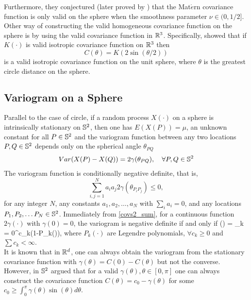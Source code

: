 Furthermore, they conjectured (later proved by \cite{Gneiting2013}) that the Mat$\acute{e}$rn covariance function is only valid on the sphere when the smoothness parameter $\nu\in(0,1/2]$. Other way of constructing the valid homogeneous covariance function on the sphere is by using the valid covariance function in $\mathbb{R}^3$. Specifically, \cite{Yadrenko1983} showed that if $K(\cdot)$ is valid isotropic covariance function on $\mathbb{R}^3$ then
\[
	C(\theta) = K(2\sin(\theta/2))
\]
is a valid isotropic covariance function on the unit sphere, where $\theta$ is the greatest circle distance on the sphere.
			
		\subsection{Variogram on a Sphere}
			
Parallel to the case of circle, if a random process $X(\cdot)$ on a sphere is intrinsically stationary on $\mathbb{S}^2$, then one has $E(X(P))=\mu$, an unknown constant for all $P\in \mathbb{S}^2$ and the variogram function between any two locations $P, Q \in \mathbb{S}^2$ depends only on the spherical angle $\theta_{PQ}$	
		\[
			Var(X(P)-X(Q)) = 2\gamma(\theta_{PQ}), \quad \forall P, Q \in \mathbb{S}^2
		\]
		The variogram function is conditionally negative definite, that is,
		\[
			\sum_{i,j=1}^{N} a_i a_j 2\gamma(\theta_{P_iP_j}) \le 0,
		\]
for any integer $N$, any constants $a_1, a_2, \ldots, a_N$ with $\sum_i a_i = 0$, and any locations $P_1, P_2, \ldots P_N \in \mathbb{S}^2$. Immediately from \eqref{covs2_sum}, for a continuous function $2\gamma(\cdot)$ with $\gamma(0)=0$, the variogram is negative definite if and only if
		\beq
		\gamma(\theta) = \sum_{k = 0}^\infty c_k(1-P_k(\cos\theta)), \quad \theta [0,\pi]
		\eeq
where $P_{k}(\cdot)$ are Legendre polynomials, $\forall c_k\ge 0$ and $\sum c_k < \infty$. \\
			
It is known that in $\mathbb{R}^d$, one can always obtain the variogram from the stationary covariance function with $\gamma(\theta) = C(0) - C(\theta)$ but not the converse. However, in $\mathbb{S}^2$ \cite{Yaglom1961} argued that for a valid $\gamma(\theta), \theta \in [0,\pi]$ one can always construct the covariance function $C(\theta)=c_0-\gamma(\theta)$ for some $c_0 \ge \int_0^{\pi} \gamma(\theta)\sin(\theta)d\theta$. \\
			
